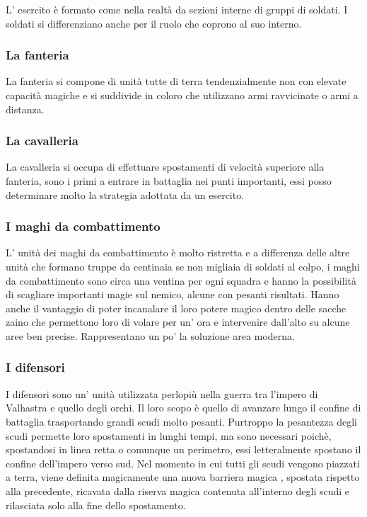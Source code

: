 \documentclass[a4paper,12pt]{book}
\begin{document}
L' esercito è formato come nella realtà da sezioni interne di gruppi di soldati.
I soldati si differenziano anche per il ruolo che coprono al suo interno.

\subsubsection{La fanteria}

La fanteria si compone di unità tutte di terra tendenzialmente non con elevate capacità magiche e si suddivide in coloro che utilizzano armi ravvicinate o armi a distanza.

\subsubsection{La cavalleria}

La cavalleria si occupa di effettuare spostamenti di velocità superiore alla fanteria, sono i primi a entrare in battaglia nei punti importanti, essi posso determinare molto la strategia adottata da un esercito.

\subsubsection{I maghi da  combattimento}

L' unità dei maghi da combattimento è molto ristretta e a differenza delle altre unità che formano truppe da centinaia se non migliaia di soldati al colpo, i maghi da combattimento sono circa una ventina per ogni squadra e hanno la possibilità di scagliare importanti magie sul nemico, alcune con pesanti risultati. Hanno anche il vantaggio di poter incanalare il loro potere magico dentro delle sacche zaino che permettono loro di volare per un' ora e intervenire dall'alto su alcune aree ben precise.
Rappresentano un po' la soluzione area moderna.

\subsubsection{I difensori}

I difensori sono un' unità utilizzata perlopiù nella guerra tra l'impero di Valhastra e quello degli orchi.
Il loro scopo è quello di avanzare lungo il confine di battaglia trasportando grandi scudi molto pesanti.
Purtroppo la pesantezza degli scudi permette loro spostamenti in lunghi tempi, ma sono necessari poichè, spostandosi in linea retta o comunque un perimetro, essi letteralmente spostano il confine dell'impero verso sud.
Nel momento in cui tutti gli scudi vengono piazzati a terra, viene definita magicamente una nuova barriera magica , spostata rispetto alla precedente, ricavata dalla riserva magica contenuta all'interno degli scudi e rilasciata solo alla fine dello spostamento.
\end{document}
